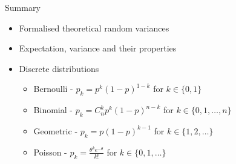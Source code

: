 \documentclass{beamer}
\begin{document}
\begin{frame}{Summary}  
\begin{itemize} 
 \item Formalised theoretical random variances 
\item Expectation, variance and their properties 
\item Discrete distributions 
\begin{itemize} 
\item Bernoulli - $p_k= p^k (1-p)^{1-k}$ for $k \in \{0, 1\}$
\item Binomial - $p_k= C^k_n p^k (1-p)^{n-k}$ for $k \in \{0, 1, \ldots, n\}$
\item Geometric - $p_k = p (1-p)^{k-1} $ for $k \in \{1, 2, \ldots\}$
\item Poisson - $p_k =  \frac{\theta^k e^{-\theta}}{k!}$ for $k \in \{0, 1, \ldots\}$
\end{itemize}
\end{itemize} 
\end{frame}
\end{document}
